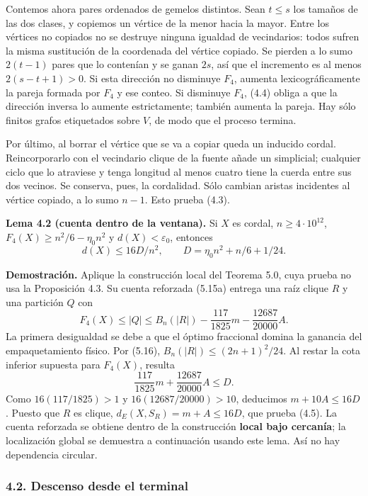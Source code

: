 \documentclass[spanish,11pt,a4paper]{article}
\begin{document}
Contemos ahora pares ordenados de gemelos distintos. Sean \(t\le s\) los tamaños de las dos clases, y copiemos un vértice de la menor hacia la mayor. Entre los vértices no copiados no se destruye ninguna igualdad de vecindarios: todos sufren la misma sustitución de la coordenada del vértice copiado. Se pierden a lo sumo \(2(t-1)\) pares que lo contenían y se ganan \(2s\), así que el incremento es al menos \(2(s-t+1)>0\). Si esta dirección no disminuye \(F_4\), aumenta lexicográficamente la pareja formada por \(F_4\) y ese conteo. Si disminuye \(F_4\), (4.4) obliga a que la dirección inversa lo aumente estrictamente; también aumenta la pareja. Hay sólo finitos grafos etiquetados sobre \(V\), de modo que el proceso termina.

Por último, al borrar el vértice que se va a copiar queda un inducido cordal. Reincorporarlo con el vecindario clique de la fuente añade un simplicial; cualquier ciclo que lo atraviese y tenga longitud al menos cuatro tiene la cuerda entre sus dos vecinos. Se conserva, pues, la cordalidad. Sólo cambian aristas incidentes al vértice copiado, a lo sumo \(n-1\). Esto prueba (4.3).


\textbf{Lema 4.2 (cuenta dentro de la ventana).} Si \(X\) es cordal, \(n\ge4\cdot10^{12}\), \(F_4(X)\ge n^2/6-\eta_0n^2\) y \(d(X)<\varepsilon_0\), entonces \[
d(X)\le16D/n^2,\qquad D=\eta_0n^2+n/6+1/24.
\tag{4.5}
\]

\textbf{Demostración.} Aplique la construcción local del Teorema 5.0, cuya prueba no usa la Proposición 4.3. Su cuenta reforzada (5.15a) entrega una raíz clique \(R\) y una partición \(Q\) con \[
F_4(X)\le |Q|\le B_n(|R|)-\frac{117}{1825}m-\frac{12687}{20000}A.
\] La primera desigualdad se debe a que el óptimo fraccional domina la ganancia del empaquetamiento físico. Por (5.16), \(B_n(|R|)\le(2n+1)^2/24\). Al restar la cota inferior supuesta para \(F_4(X)\), resulta \[
\frac{117}{1825}m+\frac{12687}{20000}A\le D.
\] Como \(16(117/1825)>1\) y \(16(12687/20000)>10\), deducimos \(m+10A\le16D\). Puesto que \(R\) es clique, \(d_E(X,S_R)=m+A\le16D\), que prueba (4.5). La cuenta reforzada se obtiene dentro de la construcción \textbf{local bajo cercanía}; la localización global se demuestra a continuación usando este lema. Así no hay dependencia circular.

\subsubsection{4.2. Descenso desde el terminal}\label{descenso-desde-el-terminal}
\end{document}
